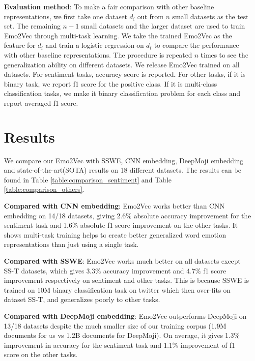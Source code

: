 \documentclass[11pt,a4paper]{article}
\begin{document}
\noindent\textbf{Evaluation method}: To make a fair comparison with other baseline representations, we first take one dataset $d_i$ out from $n$ small datasets as the test set. The remaining $n-1$ small datasets and the larger dataset are used to train Emo2Vec through multi-task learning. We take the trained Emo2Vec as the feature for $d_i$ and train a logistic regression on $d_i$ to compare the performance with other baseline representations. The procedure is repeated $n$ times to see the generalization ability on different datasets. We release Emo2Vec trained on all datasets.  For sentiment tasks, accuracy score is reported. For other tasks,  if it is binary task, we report f1 score for the positive class. If it is multi-class classification tasks, we make it binary classification problem for each class and report averaged f1 score. 




\section{Results}

We compare our Emo2Vec with SSWE, CNN embedding, DeepMoji embedding  and state-of-the-art(SOTA) results on 18 different datasets. The results can be found in Table \ref{table:comparison_sentiment} and 
Table \ref{table:comparison_others}.


\noindent\textbf{Compared with CNN embedding}: Emo2Vec works better than CNN embedding on 14/18 datasets,  giving 2.6\% absolute accuracy improvement for the sentiment task  and 1.6\% absolute f1-score improvement  on the other tasks. It shows multi-task training helps to create better generalized word emotion representations than just using a single task. 

\noindent\textbf{Compared with SSWE}: Emo2Vec works much better on all datasets except SS-T datasets, which gives 3.3\% accuracy improvement  and 4.7\% f1 score improvement respectively on sentiment and other tasks. This is because SSWE is trained on 10M binary classification task on twitter which then over-fits on dataset SS-T, and generalizes poorly to  other tasks. 

\noindent\textbf{Compared with DeepMoji embedding}: Emo2Vec outperforms DeepMoji on 13/18 datasets despite the much smaller size of our training corpus (1.9M documents for us vs 1.2B documents for DeepMoji). On average, it gives 1.3\% improvement in accuracy for the sentiment task  and 1.1\% improvement of f1-score on the other tasks. 
\end{document}
